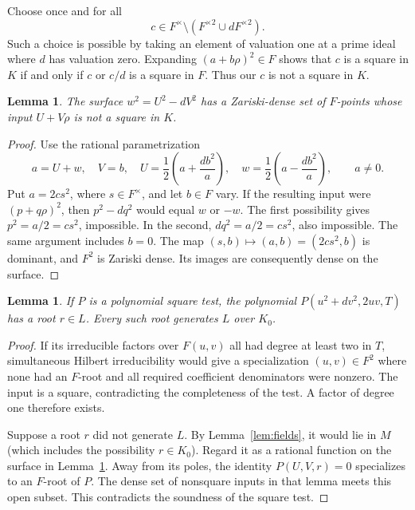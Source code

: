\documentclass[11pt,a4paper]{article}
\newtheorem{lemma}[theorem]{Lemma}
\begin{document}
Choose once and for all
\begin{equation}\label{eq:badc}
                    c\in F^\times\setminus(F^{\times2}\cup dF^{\times2}).
\end{equation}
Such a choice is possible by taking an element of valuation one at a
prime ideal where $d$ has valuation zero. Expanding
$(a+b\rho)^2\in F$ shows that $c$ is a square in $K$ if and only if
$c$ or $c/d$ is a square in $F$. Thus our $c$ is not a square in $K$.

\begin{lemma}\label{lem:bad-dense}
The surface $w^2=U^2-dV^2$ has a Zariski-dense set of $F$-points
whose input $U+V\rho$ is not a square in $K$.
\end{lemma}
\begin{proof}
Use the rational parametrization
\[
 a=U+w,\quad V=b,\quad
 U=\frac12\left(a+\frac{db^2}{a}\right),\quad
 w=\frac12\left(a-\frac{db^2}{a}\right),\qquad a\ne0.
\]
Put $a=2cs^2$, where $s\in F^\times$, and let $b\in F$ vary.
If the resulting input were $(p+q\rho)^2$, then
$p^2-dq^2$ would equal $w$ or $-w$. The first possibility gives
$p^2=a/2=cs^2$, impossible. In the second,
$dq^2=a/2=cs^2$, also impossible. The same argument includes $b=0$.
The map $(s,b)\mapsto(a,b)=(2cs^2,b)$ is dominant, and $F^2$ is
Zariski dense. Its images are consequently dense on the surface.
\end{proof}

\begin{lemma}\label{lem:primitive}
If $P$ is a polynomial square test, the polynomial
$P(u^2+dv^2,2uv,T)$ has a root $r\in L$. Every such root generates
$L$ over $K_0$.
\end{lemma}
\begin{proof}
If its irreducible factors over $F(u,v)$ all had degree at least two
in $T$, simultaneous Hilbert irreducibility would give a specialization
$(u,v)\in F^2$ where none had an $F$-root and all required coefficient
denominators were nonzero. The input is a square, contradicting
the completeness of the test. A factor of degree one therefore exists.

Suppose a root $r$ did not generate $L$. By Lemma~\ref{lem:fields},
it would lie in $M$ (which includes the possibility $r\in K_0$).
Regard it as a rational function on the surface in
Lemma~\ref{lem:bad-dense}. Away from its poles, the identity
$P(U,V,r)=0$ specializes to an $F$-root of $P$. The dense set of
nonsquare inputs in that lemma meets this open subset. This contradicts
the soundness of the square test.
\end{proof}
\end{document}
